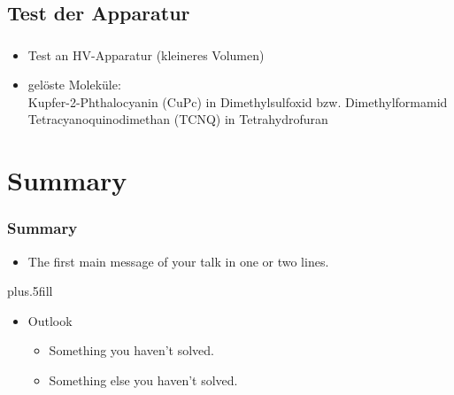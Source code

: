 \documentclass{beamer}
\begin{document}
\subsection[Ergebnisse]{Test der Apparatur}

\begin{frame}
\frametitle{}
\begin{itemize}
  \item Test an HV-Apparatur (kleineres Volumen)
  \item gelöste Moleküle: \\
  Kupfer-2-Phthalocyanin (CuPc) in Dimethylsulfoxid bzw. Dimethylformamid\\
  Tetracyanoquinodimethan (TCNQ) in Tetrahydrofuran
\end{itemize}
\end{frame}





\section*{Summary}

\begin{frame}
\frametitle<presentation>{Summary}

\begin{itemize}
  \item The \alert{first main message} of your talk in one or two lines.
\end{itemize}




\vskip0pt plus.5fill
\begin{itemize}
  \item Outlook
  \begin{itemize}
    \item Something you haven't solved.
    \item Something else you haven't solved.
  \end{itemize}
\end{itemize}
\end{frame}
\end{document}
